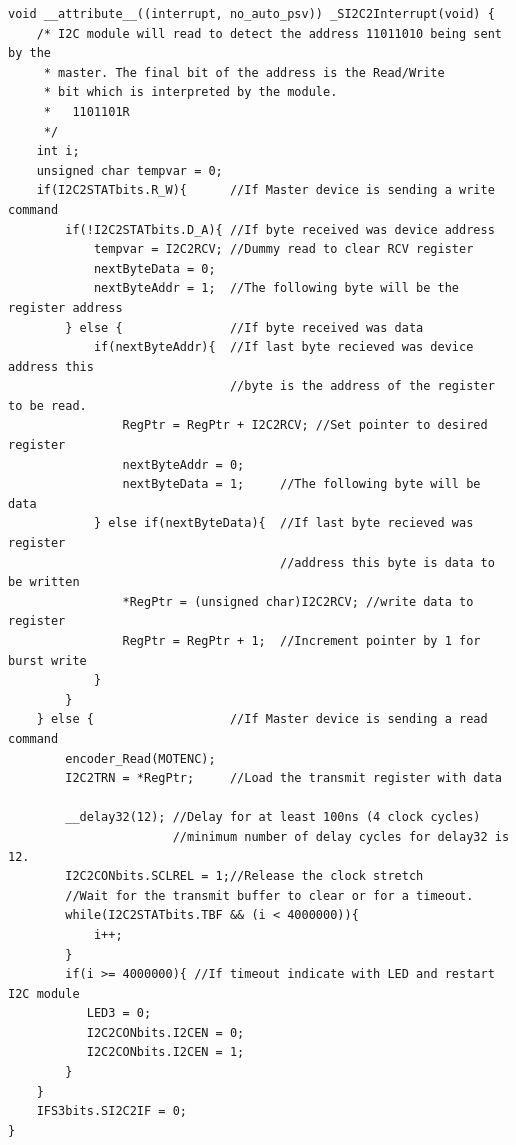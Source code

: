 \documentclass{article}
\begin{document}
\begin{lstlisting}[xleftmargin=\parindent,frame=L]
void __attribute__((interrupt, no_auto_psv)) _SI2C2Interrupt(void) {
    /* I2C module will read to detect the address 11011010 being sent by the
     * master. The final bit of the address is the Read/Write
     * bit which is interpreted by the module.
     *   1101101R
     */
    int i;
    unsigned char tempvar = 0;
    if(I2C2STATbits.R_W){      //If Master device is sending a write command
        if(!I2C2STATbits.D_A){ //If byte received was device address
            tempvar = I2C2RCV; //Dummy read to clear RCV register
            nextByteData = 0;
            nextByteAddr = 1;  //The following byte will be the register address
        } else {               //If byte received was data
            if(nextByteAddr){  //If last byte recieved was device address this
                               //byte is the address of the register to be read.
                RegPtr = RegPtr + I2C2RCV; //Set pointer to desired register
                nextByteAddr = 0;
                nextByteData = 1;     //The following byte will be data
            } else if(nextByteData){  //If last byte recieved was register
                                      //address this byte is data to be written
                *RegPtr = (unsigned char)I2C2RCV; //write data to register
                RegPtr = RegPtr + 1;  //Increment pointer by 1 for burst write
            }
        }
    } else {                   //If Master device is sending a read command
        encoder_Read(MOTENC);
        I2C2TRN = *RegPtr;     //Load the transmit register with data
        
        __delay32(12); //Delay for at least 100ns (4 clock cycles)
                       //minimum number of delay cycles for delay32 is 12.
        I2C2CONbits.SCLREL = 1;//Release the clock stretch
        //Wait for the transmit buffer to clear or for a timeout.
        while(I2C2STATbits.TBF && (i < 4000000)){
            i++;
        }
        if(i >= 4000000){ //If timeout indicate with LED and restart I2C module
           LED3 = 0;
           I2C2CONbits.I2CEN = 0;
           I2C2CONbits.I2CEN = 1;
        }
    }
    IFS3bits.SI2C2IF = 0;
}
\end{lstlisting}
\end{document}
